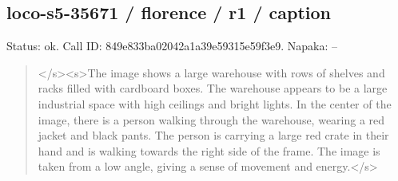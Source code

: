 \documentclass[10pt,a4paper]{article}
\begin{document}
\subsection*{loco-s5-35671 / florence / r1 / caption}
Status: ok. Call ID: 849e833ba02042a1a39e59315e59f3e9. Napaka: --
\begin{quote}\footnotesize
</s>\allowbreak{}<s>\allowbreak{}The image shows a large warehouse with rows of shelves and racks filled with cardboard boxes. The warehouse appears to be a large industrial space with high ceilings and bright lights. In the center of the image,\allowbreak{} there is a person walking through the warehouse,\allowbreak{} wearing a red jacket and black pants. The person is carrying a large red crate in their hand and is walking towards the right side of the frame. The image is taken from a low angle,\allowbreak{} giving a sense of movement and energy.</s>\allowbreak{}
\end{quote}
\end{document}
